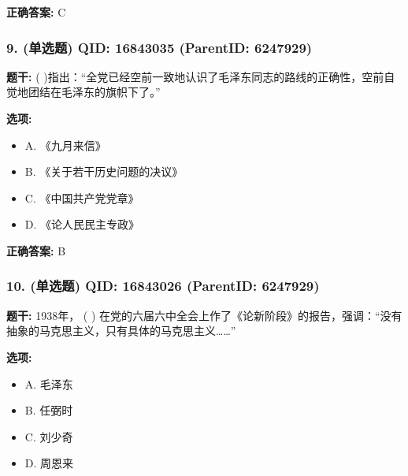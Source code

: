 \documentclass[12pt,UTF8]{ctexart}
\begin{document}
\textbf{正确答案:}
C

\vspace{0.3em}\hrulefill\vspace{0.7em}

\subsubsection*{9. (单选题) \small QID: 16843035 (ParentID: 6247929)}

\textbf{题干:}
( )指出：“全党已经空前一致地认识了毛泽东同志的路线的正确性，空前自觉地团结在毛泽东的旗帜下了。”



\textbf{选项:}
\begin{itemize}[leftmargin=*]

  \item A. 《九月来信》

  \item B. 《关于若干历史问题的决议》

  \item C. 《中国共产党党章》

  \item D. 《论人民民主专政》

\end{itemize}

\textbf{正确答案:}
B

\vspace{0.3em}\hrulefill\vspace{0.7em}

\subsubsection*{10. (单选题) \small QID: 16843026 (ParentID: 6247929)}

\textbf{题干:}
1938年， ( ) 在党的六届六中全会上作了《论新阶段》的报告，强调：“没有抽象的马克思主义，只有具体的马克思主义……”



\textbf{选项:}
\begin{itemize}[leftmargin=*]

  \item A. 毛泽东

  \item B. 任弼时

  \item C. 刘少奇

  \item D. 周恩来

\end{itemize}
\end{document}
